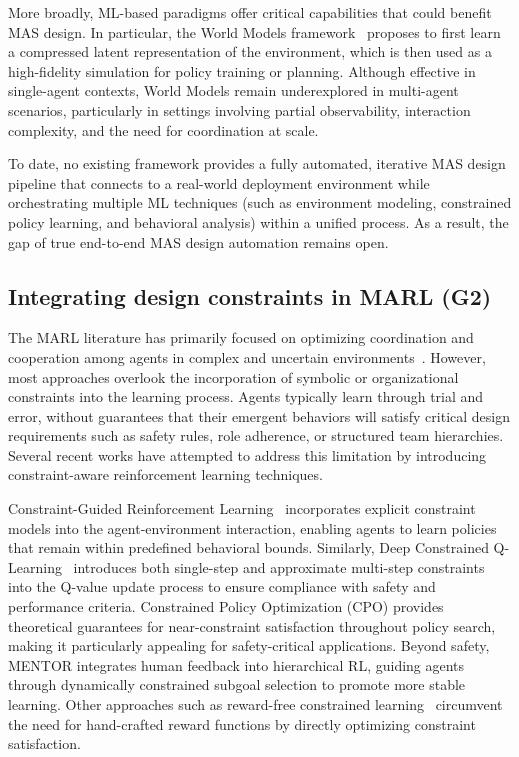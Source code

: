 \documentclass[pdflatex,sn-mathphys-num]{sn-jnl}%
\theoremstyle{thmstyleone}%
\theoremstyle{thmstyletwo}%
\theoremstyle{thmstylethree}%
\begin{document}
More broadly, ML-based paradigms offer critical capabilities that could benefit MAS design. In particular, the World Models framework~\cite{Ha2018} proposes to first learn a compressed latent representation of the environment, which is then used as a high-fidelity simulation for policy training or planning. Although effective in single-agent contexts, World Models remain underexplored in multi-agent scenarios, particularly in settings involving partial observability, interaction complexity, and the need for coordination at scale.

To date, no existing framework provides a fully automated, iterative MAS design pipeline that connects to a real-world deployment environment while orchestrating multiple ML techniques (such as environment modeling, constrained policy learning, and behavioral analysis) within a unified process. As a result, the gap of true end-to-end MAS design automation remains open.

\subsection{Integrating design constraints in MARL (G2)}

The MARL literature has primarily focused on optimizing coordination and cooperation among agents in complex and uncertain environments~\cite{Zhang2021, Papoudakis2021}. However, most approaches overlook the incorporation of symbolic or organizational constraints into the learning process. Agents typically learn through trial and error, without guarantees that their emergent behaviors will satisfy critical design requirements such as safety rules, role adherence, or structured team hierarchies. Several recent works have attempted to address this limitation by introducing constraint-aware reinforcement learning techniques.

Constraint-Guided Reinforcement Learning~\cite{spieker2021constraint} incorporates explicit constraint models into the agent-environment interaction, enabling agents to learn policies that remain within predefined behavioral bounds. Similarly, Deep Constrained Q-Learning~\cite{kalweit2020deep} introduces both single-step and approximate multi-step constraints into the Q-value update process to ensure compliance with safety and performance criteria. Constrained Policy Optimization (CPO)\cite{achiam2017constrained} provides theoretical guarantees for near-constraint satisfaction throughout policy search, making it particularly appealing for safety-critical applications. Beyond safety, MENTOR\cite{zhou2024mentor} integrates human feedback into hierarchical RL, guiding agents through dynamically constrained subgoal selection to promote more stable learning. Other approaches such as reward-free constrained learning~\cite{miryoosefi2021} circumvent the need for hand-crafted reward functions by directly optimizing constraint satisfaction.
\end{document}
